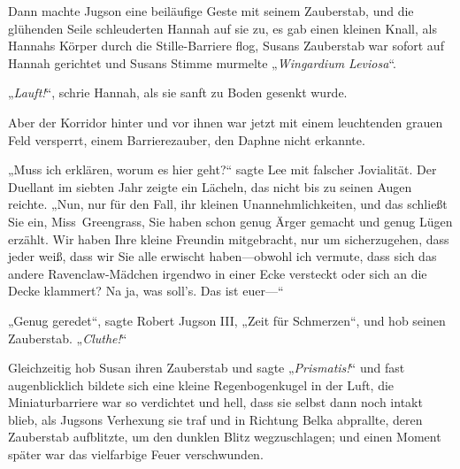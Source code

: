 Dann machte Jugson eine beiläufige Geste mit seinem Zauberstab, und die glühenden Seile schleuderten Hannah auf sie zu, es gab einen kleinen Knall, als Hannahs Körper durch die Stille-Barriere flog, Susans Zauberstab war sofort auf Hannah gerichtet und Susans Stimme murmelte „\emph{Wingardium Leviosa}“.

„\emph{Lauft!}“, schrie Hannah, als sie sanft zu Boden gesenkt wurde.

Aber der Korridor hinter und vor ihnen war jetzt mit einem leuchtenden grauen Feld versperrt, einem Barrierezauber, den Daphne nicht erkannte.

„Muss ich erklären, worum es hier geht?“ sagte Lee mit falscher Jovialität. Der Duellant im siebten Jahr zeigte ein Lächeln, das nicht bis zu seinen Augen reichte. „Nun, nur für den Fall, ihr kleinen Unannehmlichkeiten, und das schließt Sie ein, Miss~Greengrass, Sie haben schon genug Ärger gemacht und genug Lügen erzählt. Wir haben Ihre kleine Freundin mitgebracht, nur um sicherzugehen, dass jeder weiß, dass wir Sie alle erwischt haben—obwohl ich vermute, dass sich das andere Ravenclaw-Mädchen irgendwo in einer Ecke versteckt oder sich an die Decke klammert? Na ja, was soll’s. Das ist euer—“

„Genug geredet“, sagte Robert Jugson III, „Zeit für Schmerzen“, und hob seinen Zauberstab. „\emph{Cluthe!}“

Gleichzeitig hob Susan ihren Zauberstab und sagte „\emph{Prismatis!}“ und fast augenblicklich bildete sich eine kleine Regenbogenkugel in der Luft, die Miniaturbarriere war so verdichtet und hell, dass sie selbst dann noch intakt blieb, als Jugsons Verhexung sie traf und in Richtung Belka abprallte, deren Zauberstab aufblitzte, um den dunklen Blitz wegzuschlagen; und einen Moment später war das vielfarbige Feuer verschwunden.

